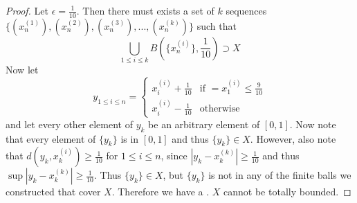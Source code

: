 \begin{proof}
Let $\epsilon = \frac{1}{10}$. Then there must exists a set of $k$ sequences $\{ (x^{(1)}_n), (x^{(2)}_n), (x^{(3)}_n), ..., (x^{(k)}_n) \}$ such that 
\[ \bigcup_{1\leq i \leq k} B(\{x^{(i)}_n\},\frac{1}{10}) \supset X \]
Now let 
\[ y_{1\leq i \leq n} = \begin{cases} x_i^{(i)}+\frac{1}{10} &\mbox{if } =x_1^{(i)} \leq \frac{9}{10}\\ 
x_i^{(i)} - \frac{1}{10} & \mbox{otherwise }  \end{cases}\]
and let every other element of $y_k$ be an arbitrary element of $[0,1]$. Now note that every element of $\{y_k\}$ is in $[0,1]$ and thus $\{y_k\}\in X$. However, also note that $d(y_k, x_k^{(i)}) \geq \frac{1}{10}$ for $1\leq i \leq n$, since $|y_k-x_k^{(k)}| \geq \frac{1}{10}$ and thus $\sup |y_k-x_k^{(k)}| \geq \frac{1}{10}$. Thus $\{y_k\} \in X$, but $\{y_k\}$ is not in any of the finite balls we constructed that cover $X$. Therefore we have a . $X$ cannot be totally bounded. 
\end{proof}
